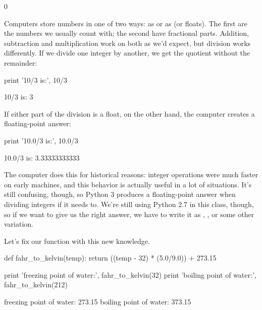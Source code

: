 \begin{VerbOut}
0
\end{VerbOut}

Computers store numbers in one of two ways: as
 or as  (or floats). The first are the numbers we usually count with;
the second have fractional parts. Addition, subtraction and
multiplication work on both as we'd expect, but division works
differently. If we divide one integer by another, we get the quotient
without the remainder:

\begin{VerbIn}
print '10/3 is:', 10/3
\end{VerbIn}

\begin{VerbOut}
10/3 is: 3
\end{VerbOut}

If either part of the division is a float, on the other hand, the
computer creates a floating-point answer:

\begin{VerbIn}
print '10.0/3 is:', 10.0/3
\end{VerbIn}

\begin{VerbOut}
10.0/3 is: 3.33333333333
\end{VerbOut}

The computer does this for historical reasons: integer operations were
much faster on early machines, and this behavior is actually useful in a
lot of situations. It's still confusing, though, so Python 3 produces a
floating-point answer when dividing integers if it needs to. We're still
using Python 2.7 in this class, though, so if we want  to
give us the right answer, we have to write it as ,
, or some other variation.

Let's fix our  function with this new
knowledge.

\begin{VerbIn}
def fahr_to_kelvin(temp):
    return ((temp - 32) * (5.0/9.0)) + 273.15

print 'freezing point of water:', fahr_to_kelvin(32)
print 'boiling point of water:', fahr_to_kelvin(212)
\end{VerbIn}

\begin{VerbOut}
freezing point of water: 273.15
boiling point of water: 373.15
\end{VerbOut}

